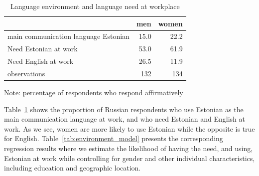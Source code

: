 \documentclass[12pt, a4paper]{article}
\begin{document}
\begin{table}[t]
	\centering
	\caption{Language environment and language need at workplace}
	\label{tab:environment_descriptive}
	\begin{tabular}{lrr}
		\toprule
		                                     & men  & women \\
		\midrule
		main communication language Estonian & 15.0 & 22.2  \\
		Need Estonian at work                & 53.0 & 61.9  \\
		Need English  at work                & 26.5 & 11.9  \\
		\midrule
		observations                         & 132  & 134   \\
		\bottomrule
	\end{tabular}
	\begin{flushleft}
		Note: percentage of respondents who respond affirmatively
	\end{flushleft}
\end{table}

Table~\ref{tab:environment_descriptive} shows the proportion of
Russian respondents who use Estonian as the main communication language at work, and
who need Estonian and English at work.  As we see, women are more likely to
use Estonian while the opposite is true for English.
Table~\ref{tab:environment_model} presents the corresponding regression results
where we estimate the likelihood of having the need, and using, Estonian at work
while
controlling for gender and other individual
characteristics, including education and geographic location.
\end{document}
